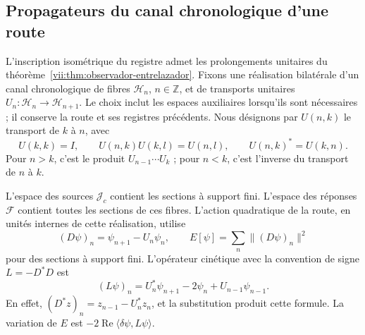 \subsection{Propagateurs du canal chronologique d'une route}
\label{vii:subsec:green-cronologico}

L'inscription isométrique du registre admet les prolongements unitaires du théorème~\ref{vii:thm:observador-entrelazador}. Fixons une réalisation bilatérale d'un canal chronologique de fibres \(\mathcal H_n\), \(n\in\mathbb Z\), et de transports unitaires \(U_n:\mathcal H_n\to\mathcal H_{n+1}\). Le choix inclut les espaces auxiliaires lorsqu'ils sont nécessaires ; il conserve la route et ses registres précédents. Nous désignons par \(U(n,k)\) le transport de \(k\) à \(n\), avec
\[
 U(k,k)=I,\qquad U(n,k)U(k,l)=U(n,l),\qquad
 U(n,k)^*=U(k,n).
\]
Pour \(n>k\), c'est le produit \(U_{n-1}\cdots U_k\) ; pour \(n<k\),
c'est l'inverse du transport de \(n\) à \(k\).

L'espace des sources \(\mathcal J_c\) contient les sections à support
fini. L'espace des réponses \(\mathcal F\) contient toutes les
sections de ces fibres. L'action quadratique de la route, en unités
internes de cette réalisation, utilise
\[
 (D\psi)_n=\psi_{n+1}-U_n\psi_n,\qquad
 E[\psi]=\sum_n\|(D\psi)_n\|^2
\]
pour des sections à support fini. L'opérateur cinétique avec la convention
de signe \(L=-D^*D\) est
\begin{equation}
 (L\psi)_n=U_n^*\psi_{n+1}-2\psi_n+U_{n-1}\psi_{n-1}.
 \label{vii:eq:diferencia-covariante-bidireccional}
\end{equation}
En effet, \((D^*z)_n=z_{n-1}-U_n^*z_n\), et la substitution produit cette formule. La variation de \(E\) est \(-2\operatorname{Re}\langle\delta\psi,L\psi\rangle\).

